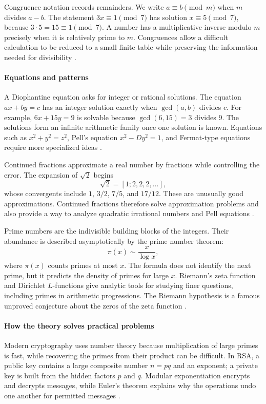 Congruence notation records remainders. We write $a\equiv b\pmod m$ when $m$ divides $a-b$. The statement $3x\equiv1\pmod7$ has solution $x\equiv5\pmod7$, because $3\cdot5=15\equiv1\pmod7$. A number has a multiplicative inverse modulo $m$ precisely when it is relatively prime to $m$. Congruences allow a difficult calculation to be reduced to a small finite table while preserving the information needed for divisibility \cite{number_theory_ref1}.

\paragraph{Equations and patterns}
A Diophantine equation asks for integer or rational solutions. The equation $ax+by=c$ has an integer solution exactly when $\gcd(a,b)$ divides $c$. For example, $6x+15y=9$ is solvable because $\gcd(6,15)=3$ divides $9$. The solutions form an infinite arithmetic family once one solution is known. Equations such as $x^2+y^2=z^2$, Pell's equation $x^2-Dy^2=1$, and Fermat-type equations require more specialized ideas \cite{number_theory_ref1,number_theory_ref3}.

Continued fractions approximate a real number by fractions while controlling the error. The expansion of $\sqrt2$ begins
\[
\sqrt2=[1;2,2,2,\ldots],
\]
whose convergents include $1$, $3/2$, $7/5$, and $17/12$. These are unusually good approximations. Continued fractions therefore solve approximation problems and also provide a way to analyze quadratic irrational numbers and Pell equations \cite{number_theory_ref1}.

Prime numbers are the indivisible building blocks of the integers. Their abundance is described asymptotically by the prime number theorem:
\[
\pi(x)\sim\frac{x}{\log x},
\]
where $\pi(x)$ counts primes at most $x$. The formula does not identify the next prime, but it predicts the density of primes for large $x$. Riemann's zeta function and Dirichlet $L$-functions give analytic tools for studying finer questions, including primes in arithmetic progressions. The Riemann hypothesis is a famous unproved conjecture about the zeros of the zeta function \cite{number_theory_ref2}.

\paragraph{How the theory solves practical problems}
Modern cryptography uses number theory because multiplication of large primes is fast, while recovering the primes from their product can be difficult. In RSA, a public key contains a large composite number $n=pq$ and an exponent; a private key is built from the hidden factors $p$ and $q$. Modular exponentiation encrypts and decrypts messages, while Euler's theorem explains why the operations undo one another for permitted messages \cite{number_theory_ref2}.


